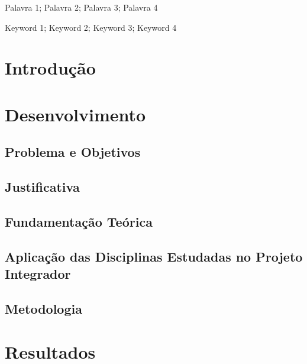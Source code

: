 \documentclass[a4paper,openright, oneside, article, 12pt, brazil]{abntex2}
\begin{document}
\imprimircapa

\imprimirfolhaderosto

\imprimirresumo
{}
{Palavra 1; Palavra 2; Palavra 3; Palavra 4}

\imprimirabstract
{}
{Keyword 1; Keyword 2; Keyword 3; Keyword 4}
	
\newpage
\listoffigures*

\newpage
\tableofcontents*

\textual

\pagestyle{fancy}
\fancyhf{}
\fancyhead[R]{\thepage}
\fancyhead[L]{\nouppercase{\rightmark}}

\newpage
\section{Introdução}


\newpage
\section{Desenvolvimento}

\subsection{Problema e Objetivos}


\subsection{Justificativa}


\subsection{Fundamentação Teórica}


\subsection{Aplicação das Disciplinas Estudadas no Projeto Integrador}


\subsection{Metodologia}


\newpage
\section{Resultados}
\end{document}
